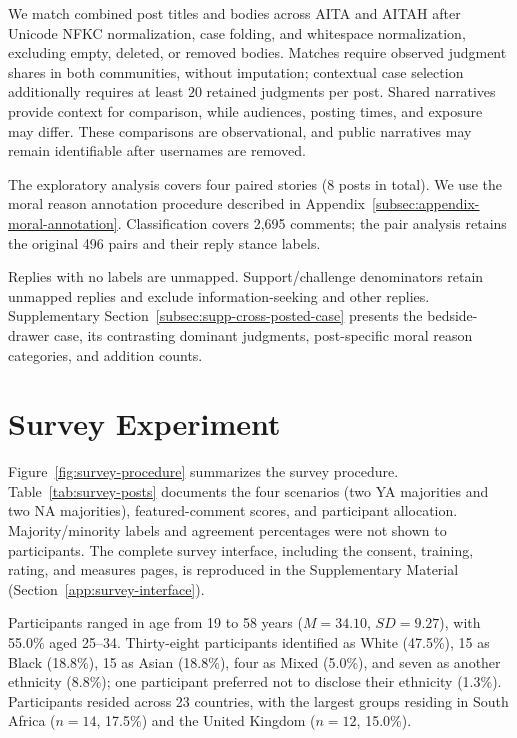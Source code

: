 \label{subsec:res-duplicates}
\label{sec:appendix-community-comparison}
We match combined post titles and bodies across AITA and AITAH after
Unicode NFKC normalization, case folding, and whitespace normalization,
excluding empty, deleted, or removed bodies. Matches require observed
judgment shares in both communities, without imputation; contextual case
selection additionally requires at least $20$ retained judgments per post.
Shared narratives provide context for comparison, while audiences,
posting times, and exposure may differ. These comparisons are observational,
and public narratives may remain identifiable after usernames are removed.

\label{subsec:appendix-cross-posted-annotations}
The exploratory analysis covers four paired stories ($8$ posts in total). We use the moral reason annotation procedure described in
Appendix~\ref{subsec:appendix-moral-annotation}.
Classification covers 2,695 comments; the pair analysis retains the
original 496 pairs and their reply stance labels.

Replies with no labels are unmapped. Support/challenge
denominators retain unmapped replies and exclude information-seeking
and other replies. Supplementary Section~\ref{subsec:supp-cross-posted-case}
presents the bedside-drawer case, its contrasting dominant judgments,
post-specific moral reason categories, and addition counts.

\section{Survey Experiment}
\label{app:survey}

Figure~\ref{fig:survey-procedure} summarizes the survey procedure.
Table~\ref{tab:survey-posts} documents the four scenarios (two YA
majorities and two NA majorities), featured-comment scores, and
participant allocation. Majority/minority labels and agreement
percentages were not shown to participants. The complete
survey interface, including the consent, training, rating, and measures
pages, is reproduced in the Supplementary Material
(Section~\ref{app:survey-interface}).

Participants ranged in age from 19 to 58 years
($M=34.10$, $SD=9.27$), with 55.0\% aged 25--34. Thirty-eight
participants identified as White (47.5\%), 15 as Black (18.8\%),
15 as Asian (18.8\%), four as Mixed (5.0\%), and seven as another
ethnicity (8.8\%); one participant preferred not to disclose their
ethnicity (1.3\%). Participants resided across 23 countries, with
the largest groups residing in South Africa ($n=14$, 17.5\%) and
the United Kingdom ($n=12$, 15.0\%).

